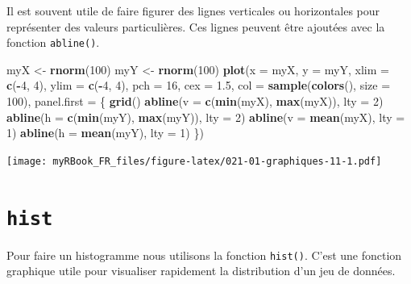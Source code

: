 \documentclass[]{book}
\newenvironment{Shaded}{\begin{snugshade}}{\end{snugshade}}
\newcommand{\DataTypeTok}[1]{\textcolor[rgb]{0.13,0.29,0.53}{#1}}
\newcommand{\DecValTok}[1]{\textcolor[rgb]{0.00,0.00,0.81}{#1}}
\newcommand{\FloatTok}[1]{\textcolor[rgb]{0.00,0.00,0.81}{#1}}
\newcommand{\KeywordTok}[1]{\textcolor[rgb]{0.13,0.29,0.53}{\textbf{#1}}}
\newcommand{\NormalTok}[1]{#1}
\newcommand{\OperatorTok}[1]{\textcolor[rgb]{0.81,0.36,0.00}{\textbf{#1}}}
\newcommand{\StringTok}[1]{\textcolor[rgb]{0.31,0.60,0.02}{#1}}
\begin{document}
Il est souvent utile de faire figurer des lignes verticales ou horizontales pour représenter des valeurs particulières. Ces lignes peuvent être ajoutées avec la fonction \texttt{abline()}.

\begin{Shaded}
\begin{Highlighting}[]
\NormalTok{myX <-}\StringTok{ }\KeywordTok{rnorm}\NormalTok{(}\DecValTok{100}\NormalTok{)}
\NormalTok{myY <-}\StringTok{ }\KeywordTok{rnorm}\NormalTok{(}\DecValTok{100}\NormalTok{)}
\KeywordTok{plot}\NormalTok{(}\DataTypeTok{x =}\NormalTok{ myX, }\DataTypeTok{y =}\NormalTok{ myY, }
  \DataTypeTok{xlim =} \KeywordTok{c}\NormalTok{(}\OperatorTok{-}\DecValTok{4}\NormalTok{, }\DecValTok{4}\NormalTok{), }\DataTypeTok{ylim =} \KeywordTok{c}\NormalTok{(}\OperatorTok{-}\DecValTok{4}\NormalTok{, }\DecValTok{4}\NormalTok{),   }
  \DataTypeTok{pch =} \DecValTok{16}\NormalTok{, }\DataTypeTok{cex =} \FloatTok{1.5}\NormalTok{, }
  \DataTypeTok{col =} \KeywordTok{sample}\NormalTok{(}\KeywordTok{colors}\NormalTok{(), }\DataTypeTok{size =} \DecValTok{100}\NormalTok{),}
  \DataTypeTok{panel.first =}\NormalTok{ \{}
    \KeywordTok{grid}\NormalTok{()}
    \KeywordTok{abline}\NormalTok{(}\DataTypeTok{v =} \KeywordTok{c}\NormalTok{(}\KeywordTok{min}\NormalTok{(myX), }\KeywordTok{max}\NormalTok{(myX)), }\DataTypeTok{lty =} \DecValTok{2}\NormalTok{)}
    \KeywordTok{abline}\NormalTok{(}\DataTypeTok{h =} \KeywordTok{c}\NormalTok{(}\KeywordTok{min}\NormalTok{(myY), }\KeywordTok{max}\NormalTok{(myY)), }\DataTypeTok{lty =} \DecValTok{2}\NormalTok{)}
    \KeywordTok{abline}\NormalTok{(}\DataTypeTok{v =} \KeywordTok{mean}\NormalTok{(myX), }\DataTypeTok{lty =} \DecValTok{1}\NormalTok{)}
    \KeywordTok{abline}\NormalTok{(}\DataTypeTok{h =} \KeywordTok{mean}\NormalTok{(myY), }\DataTypeTok{lty =} \DecValTok{1}\NormalTok{)}
\NormalTok{\})}
\end{Highlighting}
\end{Shaded}

\texttt{[image: myRBook\_FR\_files/figure-latex/021-01-graphiques-11-1.pdf]}

\hypertarget{graph1hist}{%
\section{\texorpdfstring{\texttt{hist}}{hist}}\label{graph1hist}}

Pour faire un histogramme nous utilisons la fonction \texttt{hist()}. C'est une fonction graphique utile pour visualiser rapidement la distribution d'un jeu de données.
\end{document}
